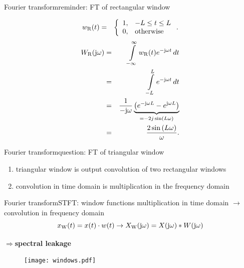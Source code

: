 	\begin{frame}{Fourier transform}{reminder: FT of rectangular window}
        \vspace{-8mm}
        \begin{footnotesize}
        \begin{eqnarray*}
            w_{\mathrm{R}}(t)	&=& \left\lbrace  
                        \begin{array}{ll} 
                                                    1, & -L \leq t \leq L\\ 
                          \vphantom{\frac{1}{1}} 	0, & \text{otherwise} \\ 
                        \end{array} 
                        \right. .
        \end{eqnarray*}
\pause
        \begin{eqnarray*}
            W_{\mathrm{R}}(\mathrm{j}\omega) 	&=& \int\limits_{-\infty}^{\infty} {w_{\mathrm{R}}(t){e}^{-\mathrm{j}\omega t}\,dt}\nonumber\\
                        &=& \int\limits_{-L}^{L} {{e}^{-\mathrm{j}\omega t}\,dt}\nonumber\\
                        &=& \frac{1}{-\mathrm{j}\omega} \underbrace{\left({e}^{-\mathrm{j}{\omega L}}-{e}^{\mathrm{j}{\omega L}}\right)}_{= -2j\sin\left({L\omega}\right)}\nonumber\\
                        &=& \frac{2\sin\left({L\omega}\right)}{{\omega}}  .
        \end{eqnarray*}
        \end{footnotesize}
	\end{frame}	

	\begin{frame}{Fourier transform}{question: FT of triangular window}
        \bigskip
        \bigskip
        \begin{enumerate}
            \item   triangular window is output convolution of two rectangular windows
            \item   convolution in time domain is multiplication in the frequency domain
        \end{enumerate}
	\end{frame}	

	\begin{frame}{Fourier transform}{STFT: window functions}
		multiplication in time domain $\rightarrow$ convolution in frequency domain
        \begin{equation*}
            x_\mathrm{W}(t) = x(t)\cdot w(t) \rightarrow X_\mathrm{W}(\mathrm{j}\omega) = X(\mathrm{j}\omega) \ast W(\mathrm{j}\omega)
        \end{equation*}

		\pause		
		$\Rightarrow$\textbf{spectral leakage}
		\begin{figure}
			\centering
				\texttt{[image: windows.pdf]}
			\label{fig:windows}
		\end{figure}
	\end{frame}	

